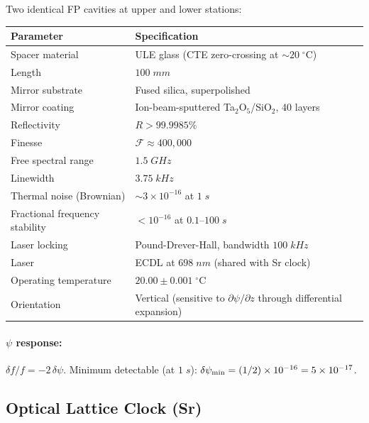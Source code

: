 \documentclass[11pt,a4paper]{article}
\begin{document}
Two identical FP cavities at upper and lower stations:

\begin{longtable}{p{}p{}}
\toprule
\textbf{Parameter} & \textbf{Specification} \\
\midrule
\endhead
Spacer material & ULE glass (CTE zero-crossing at $\sim 20\;^\circ$C) \\
Length & $100\;\si{mm}$ \\
Mirror substrate & Fused silica, superpolished \\
Mirror coating & Ion-beam-sputtered Ta$_2$O$_5$/SiO$_2$, 40 layers \\
Reflectivity & $R > 99.9985\%$ \\
Finesse & $\mathcal{F} \approx 400{,}000$ \\
Free spectral range & $1.5\;\si{GHz}$ \\
Linewidth & $3.75\;\si{kHz}$ \\
Thermal noise (Brownian) & $\sim 3 \times 10^{-16}$ at $1\;\si{s}$ \\
Fractional frequency stability & $< 10^{-16}$ at $0.1$--$100\;\si{s}$ \\
Laser locking & Pound-Drever-Hall, bandwidth $100\;\si{kHz}$ \\
Laser & ECDL at $698\;\si{nm}$ (shared with Sr clock) \\
Operating temperature & $20.00 \pm 0.001\;^\circ$C \\
Orientation & Vertical (sensitive to $\partial\psi/\partial z$
through differential expansion) \\
\bottomrule
\end{longtable}

\paragraph{$\psi$ response:}
$\delta f/f = -2\,\delta\psi$.
Minimum detectable (at $1\;\si{s}$): $\delta\psi_{\rm min}
= (1/2) \times 10^{-16} = 5 \times 10^{-17}$.

\subsection{Optical Lattice Clock (Sr)}
\end{document}
